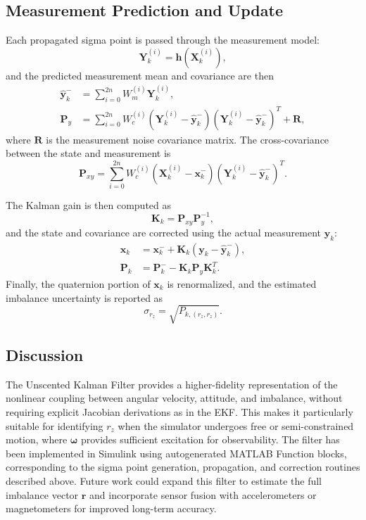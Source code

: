 \subsection*{Measurement Prediction and Update}

Each propagated sigma point is passed through the measurement model:
\begin{equation}
    \bm{Y}_k^{(i)} = \bm{h}(\bm{X}_k^{(i)}),
\end{equation}
and the predicted measurement mean and covariance are then
\begin{align}
    \hat{\bm{y}}_k^- &= \sum_{i=0}^{2n} W_m^{(i)} \bm{Y}_k^{(i)},\\
    \bm{P}_y &= \sum_{i=0}^{2n} W_c^{(i)}(\bm{Y}_k^{(i)} - \hat{\bm{y}}_k^-)(\bm{Y}_k^{(i)} - \hat{\bm{y}}_k^-)^T + \bm{R},
\end{align}
where $\bm{R}$ is the measurement noise covariance matrix. The cross-covariance between the state and measurement is
\begin{equation}
    \bm{P}_{xy} = \sum_{i=0}^{2n} W_c^{(i)}(\bm{X}_k^{(i)} - \bm{x}_k^-)(\bm{Y}_k^{(i)} - \hat{\bm{y}}_k^-)^T.
\end{equation}

The Kalman gain is then computed as
\begin{equation}
    \bm{K}_k = \bm{P}_{xy}\bm{P}_y^{-1},
\end{equation}
and the state and covariance are corrected using the actual measurement $\bm{y}_k$:
\begin{align}
    \bm{x}_k &= \bm{x}_k^- + \bm{K}_k(\bm{y}_k - \hat{\bm{y}}_k^-),\\
    \bm{P}_k &= \bm{P}_k^- - \bm{K}_k\bm{P}_y\bm{K}_k^T.
\end{align}
Finally, the quaternion portion of $\bm{x}_k$ is renormalized, and the estimated imbalance uncertainty is reported as
\begin{equation}
    \sigma_{r_z} = \sqrt{P_{k,(r_z,r_z)}}.
\end{equation}

\subsection*{Discussion}

The Unscented Kalman Filter provides a higher-fidelity representation of the nonlinear coupling between angular velocity, attitude, and imbalance, without requiring explicit Jacobian derivations as in the EKF. This makes it particularly suitable for identifying $r_z$ when the simulator undergoes free or semi-constrained motion, where $\bm{\omega}$ provides sufficient excitation for observability. The filter has been implemented in Simulink using autogenerated MATLAB Function blocks, corresponding to the sigma point generation, propagation, and correction routines described above. Future work could expand this filter to estimate the full imbalance vector $\bm{r}$ and incorporate sensor fusion with accelerometers or magnetometers for improved long-term accuracy.


